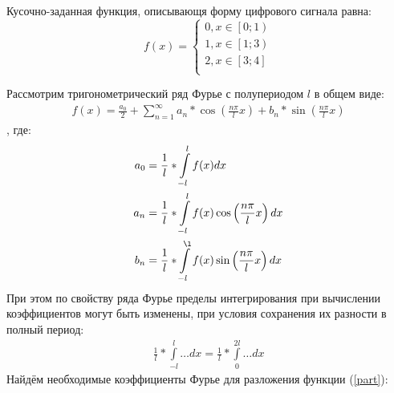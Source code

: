 \documentclass[12pt, a4paper]{article}
\begin{document}
Кусочно-заданная функция, описывающя форму цифрового сигнала равна:
 \begin{equation}\label{part}
f(x)=
\begin{cases}
0, x\in\left[0;1\right)\\
1, x\in\left[1;3\right)\\
2, x\in\left[3;4\right]\\
\end{cases}
\end{equation}

Рассмотрим тригонометрический ряд Фурье с полупериодом $l$ в общем виде:
 \begin{equation*}
\begin{aligned}
f(x)=\frac{a_0}{2}+\sum_{n=1}^{\infty}a_n*\cos\left(\frac{n\pi}{l}x\right)+b_n*\sin\left(\frac{n\pi}{l}x\right)
\end{aligned}
\end{equation*},
где:
 \begin{equation*}
\begin{aligned}
a_0 &= \frac{1}{l}*\int\limits_{-l}^{l}f(x)dx\\
a_n &= \frac{1}{l}*\int\limits_{-l}^{l}f(x)\cos\left(\frac{n\pi}{l}x\right)dx\\
b_n &= \frac{1}{l}*\int\limits_{-l}^{\l}f(x)\sin\left(\frac{n\pi}{l}x\right)dx\\
\end{aligned}
\end{equation*}
При этом по свойству ряда Фурье пределы интегрирования при вычислении коэффициентов могут быть изменены, при условия сохранения их разности в полный период:
\begin{equation*}
\begin{aligned}
\frac{1}{l}*\int\limits_{-l}^{l}\ldots dx = \frac{1}{l}*\int\limits_{0}^{2l}\ldots dx
\end{aligned}
\end{equation*}
Найдём необходимые коэффициенты Фурье для разложения функции (\ref{part}):
\end{document}

